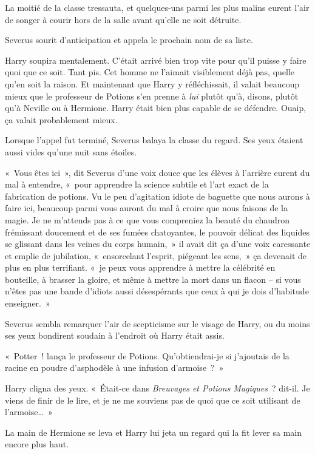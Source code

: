 La moitié de la classe tressauta, et quelques-uns parmi les plus malins eurent l'air de songer à courir hors de la salle avant qu'elle ne soit détruite.

Severus sourit d'anticipation et appela le prochain nom de sa liste.

Harry soupira mentalement.
C'était arrivé bien trop vite pour qu'il puisse y faire quoi que ce soit.
Tant pis.
Cet homme ne l'aimait visiblement déjà pas, quelle qu'en soit la raison.
Et maintenant que Harry y réfléchissait, il valait beaucoup mieux que le professeur de Potions s'en prenne à \emph{lui} plutôt qu'à, disons, plutôt qu'à Neville ou à Hermione.
Harry était bien plus capable de se défendre.
Ouaip, ça valait probablement mieux.

Lorsque l'appel fut terminé, Severus balaya la classe du regard.
Ses yeux étaient aussi vides qu'une nuit sans étoiles.

«~Vous êtes ici~», dit Severus d'une voix douce que les élèves à l'arrière eurent du mal à entendre, «~pour apprendre la science subtile et l'art exact de la fabrication de potions.
Vu le peu d'agitation idiote de baguette que nous aurons à faire ici, beaucoup parmi vous auront du mal à croire que nous faisons de la magie.
Je ne m'attends pas à ce que vous compreniez la beauté du chaudron frémissant doucement et de ses fumées chatoyantes, le pouvoir délicat des liquides se glissant dans les veines du corps humain,~» il avait dit ça d'une voix caressante et emplie de jubilation, «~ensorcelant l'esprit, piégeant les sens,~» ça devenait de plus en plus terrifiant.
«~je peux vous apprendre à mettre la célébrité en bouteille, à brasser la gloire, et même à mettre la mort dans un flacon -- si vous n'êtes pas une bande d'idiots aussi désespérants que ceux à qui je dois d'habitude enseigner.~»

Severus sembla remarquer l'air de scepticisme sur le visage de Harry, ou du moins ses yeux bondirent soudain à l'endroit où Harry était assis.

«~Potter~! lança le professeur de Potions.
Qu'obtiendrai-je si j'ajoutais de la racine en poudre d'asphodèle à une infusion d'armoise~?~»

Harry cligna des yeux.
«~Était-ce dans \emph{Breuvages et Potions Magiques}~? dit-il.
Je viens de finir de le lire, et je ne me souviens pas de quoi que ce soit utilisant de l'armoise…~»

La main de Hermione se leva et Harry lui jeta un regard qui la fit lever sa main encore plus haut.

